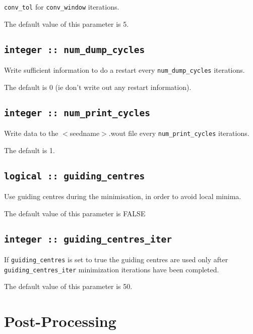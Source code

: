 \verb#conv_tol# for \verb#conv_window# iterations.

The default value of this parameter is 5.


\subsection[num\_dump\_cycles]{\tt integer :: num\_dump\_cycles}
Write sufficient information to do a restart every
\verb#num_dump_cycles# iterations.

The default is 0 (ie don't write out any restart information).

\subsection[num\_print\_cycles]{\tt integer :: num\_print\_cycles}
Write data to the $<$seedname$>$.wout file every
\verb#num_print_cycles# iterations.
                                                                                                                              
The default is 1.
                                                                                                                              



\subsection[guiding\_centres]{\tt logical :: guiding\_centres}
Use guiding centres during the minimisation, in order to avoid
local minima.

The default value of this parameter is FALSE

\subsection[guiding\_centres\_iter]{\tt integer :: guiding\_centres\_iter}
If \verb#guiding_centres# is set to true the
guiding centres are used only after \verb#guiding_centres_iter# minimization iterations
have been completed.

The default value of this parameter is 50.




\section{Post-Processing}


